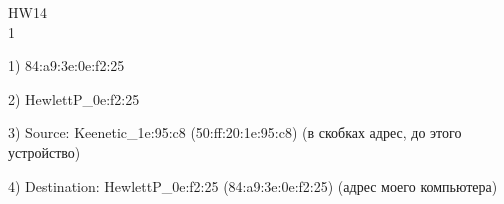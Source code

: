 \documentclass[a4paper,11pt]{article}
\begin{document}
\Large
HW14
\\
1

\begin{center}
\label{fig:image}
\end{center}
1) 84:a9:3e:0e:f2:25

2) HewlettP\_0e:f2:25

\begin{center}
\label{fig:image}
\end{center}
3) Source: Keenetic\_1e:95:c8 (50:ff:20:1e:95:c8) (в скобках адрес, до этого устройство)

4) Destination: HewlettP\_0e:f2:25 (84:a9:3e:0e:f2:25) (адрес моего компьютера)
\end{document}
